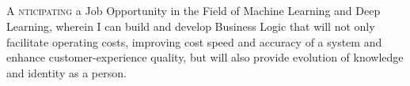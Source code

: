 \documentclass[11pt, a4paper]{article}
\begin{document}
	\begin{center}
		\textcolor{dBlue}{{\HeaderNFont \AuthorFName}\hspace{0.7cm}{\HeaderNFont \AuthorLName}} \\
		\vspace{2pt}
		{\small \textcolor{dBlue}{\CyberPresence}}
		\vspace{-23pt}
	\end{center}
	
	\textcolor{dBlue}{
		\\ \noindent\makebox[\linewidth]{\rule{\textwidth}{2.1pt}}
		\vspace{-21pt} \\
		\noindent\makebox[\linewidth]{\rule{\paperwidth}{3.9pt}}
		\vspace{-13pt} \\
	}
	
	\lettrine{\DropCaps A \hspace{1pt}}{nticipating} a Job Opportunity in the Field of Machine Learning and Deep Learning, wherein I can build and develop Business Logic that will not only facilitate operating costs, improving cost speed and accuracy of a system and enhance customer-experience quality, but will also provide evolution of knowledge and identity as a person.
	
	\pagebreak
	\pagebreak
\end{document}
